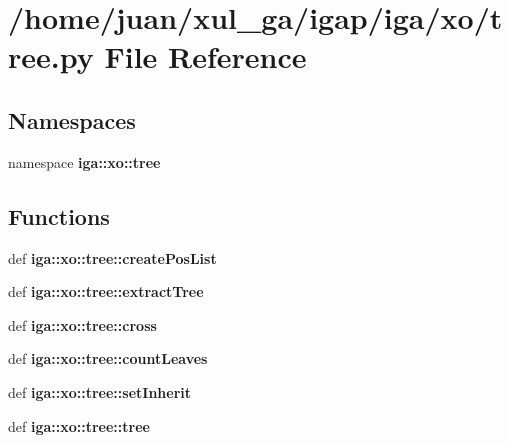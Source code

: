 \section{/home/juan/xul\_\-ga/igap/iga/xo/tree.py File Reference}
\label{xo_2tree_8py}
\subsection*{Namespaces}
\begin{CompactItemize}
\item 
namespace {\bf iga::xo::tree}
\end{CompactItemize}
\subsection*{Functions}
\begin{CompactItemize}
\item 
def {\bf iga::xo::tree::createPosList}
\item 
def {\bf iga::xo::tree::extractTree}
\item 
def {\bf iga::xo::tree::cross}
\item 
def {\bf iga::xo::tree::countLeaves}
\item 
def {\bf iga::xo::tree::setInherit}
\item 
def {\bf iga::xo::tree::tree}
\end{CompactItemize}
